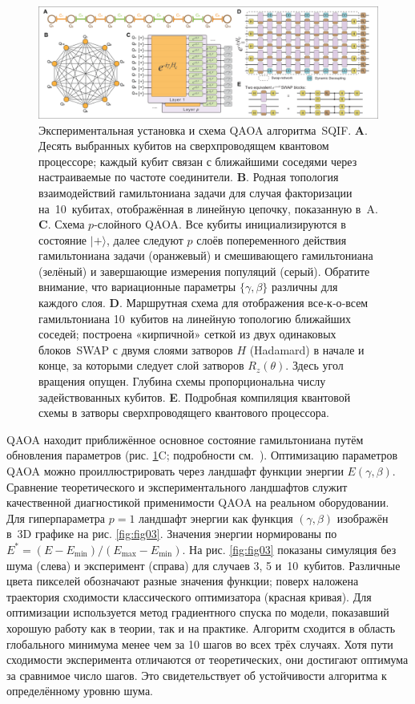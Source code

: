 \begin{figure}
    \centering
    \includegraphics[scale=0.38]{inc/fig_02.png}
    \caption{
        Экспериментальная установка и схема QAOA алгоритма SQIF. \textbf{A}.
        Десять выбранных кубитов на сверхпроводящем квантовом процессоре;
        каждый кубит связан с ближайшими соседями через настраиваемые по
        частоте соединители. \textbf{B}. Родная топология взаимодействий
        гамильтониана задачи для случая факторизации на 10 кубитах,
        отображённая в линейную цепочку, показанную в A. \textbf{C}. Схема
        $p$‑слойного QAOA. Все кубиты инициализируются в состояние $|+\rangle$,
        далее следуют $p$ слоёв попеременного действия гамильтониана задачи
        (оранжевый) и смешивающего гамильтониана (зелёный) и завершающие
        измерения популяций (серый). Обратите внимание, что вариационные
        параметры $\{\gamma,\beta\}$ различны для каждого слоя. \textbf{D}.
        Маршрутная схема для отображения все‑к‑о‑всем гамильтониана 10 кубитов
        на линейную топологию ближайших соседей; построена «кирпичной» сеткой
        из двух одинаковых блоков SWAP с двумя слоями затворов $H$ (Hadamard) в
        начале и конце, за которыми следует слой затворов $R_z(\theta)$. Здесь
        угол вращения опущен. Глубина схемы пропорциональна числу
        задействованных кубитов. \textbf{E}. Подробная компиляция квантовой
        схемы в затворы сверхпроводящего квантового процессора.
    }
    \label{fig:fig02}
\end{figure}

QAOA находит приближённое основное состояние гамильтониана путём обновления
параметров (рис. \ref{fig:fig02}C; подробности см. \cite{cite_31}). Оптимизацию
параметров QAOA можно проиллюстрировать через ландшафт функции энергии
$E(\gamma,\beta)$. Сравнение теоретического и экспериментального ландшафтов
служит качественной диагностикой применимости QAOA на реальном оборудовании.
Для гиперпараметра $p=1$ ландшафт энергии как функция $(\gamma,\beta)$
изображён в 3D графике на рис. \ref{fig:fig03}. Значения энергии нормированы по
$E^{\ast}=(E-E_{\min})/(E_{\max}-E_{\min})$. На рис. \ref{fig:fig03} показаны
симуляция без шума (слева) и эксперимент (справа) для случаев 3, 5
и 10 кубитов. Различные цвета пикселей обозначают разные значения функции;
поверх наложена траектория сходимости классического оптимизатора (красная
кривая). Для оптимизации используется метод градиентного спуска по модели,
показавший хорошую работу как в теории, так и на практике. Алгоритм сходится в
область глобального минимума менее чем за 10 шагов во всех трёх случаях. Хотя
пути сходимости эксперимента отличаются от теоретических, они достигают
оптимума за сравнимое число шагов. Это свидетельствует об устойчивости
алгоритма к определённому уровню шума.

